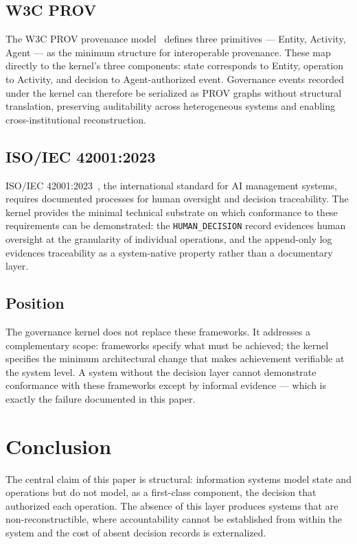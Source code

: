 \documentclass[conference]{IEEEtran}
\begin{document}
\subsection{W3C PROV}

The W3C PROV provenance model~\cite{w3c_prov} defines three primitives --- Entity, Activity, Agent --- as the minimum structure for interoperable provenance. These map directly to the kernel's three components: state corresponds to Entity, operation to Activity, and decision to Agent-authorized event. Governance events recorded under the kernel can therefore be serialized as PROV graphs without structural translation, preserving auditability across heterogeneous systems and enabling cross-institutional reconstruction.

\subsection{ISO/IEC 42001:2023}

ISO/IEC 42001:2023~\cite{iso42001}, the international standard for AI management systems, requires documented processes for human oversight and decision traceability. The kernel provides the minimal technical substrate on which conformance to these requirements can be demonstrated: the \texttt{HUMAN\_DECISION} record evidences human oversight at the granularity of individual operations, and the append-only log evidences traceability as a system-native property rather than a documentary layer.

\subsection{Position}

The governance kernel does not replace these frameworks. It addresses a complementary scope: frameworks specify what must be achieved; the kernel specifies the minimum architectural change that makes achievement verifiable at the system level. A system without the decision layer cannot demonstrate conformance with these frameworks except by informal evidence --- which is exactly the failure documented in this paper.

\section{Conclusion}

The central claim of this paper is structural: information systems model state and operations but do not model, as a first-class component, the decision that authorized each operation. The absence of this layer produces systems that are non-reconstructible, where accountability cannot be established from within the system and the cost of absent decision records is externalized.
\end{document}
